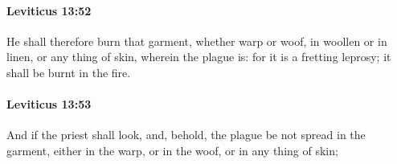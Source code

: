 		\paragraph{Leviticus 13:52} %
			\label{LEVITICUS-13-52}

			He shall therefore burn that garment, whether warp or woof, in woollen or in linen, or any thing of skin, wherein the plague is: for it is a fretting leprosy; it shall be burnt in the fire.


		\paragraph{Leviticus 13:53} %
			\label{LEVITICUS-13-53}

			And if the priest shall look, and, behold, the plague be not spread in the garment, either in the warp, or in the woof, or in any thing of skin;


